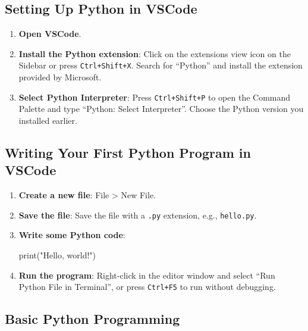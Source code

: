 \documentclass[
  letterpaper,
  DIV=11,
  numbers=noendperiod]{scrreprt}
\newenvironment{Shaded}{\begin{snugshade}}{\end{snugshade}}
\newcommand{\BuiltInTok}[1]{\textcolor[rgb]{0.00,0.23,0.31}{#1}}
\newcommand{\NormalTok}[1]{\textcolor[rgb]{0.00,0.23,0.31}{#1}}
\newcommand{\StringTok}[1]{\textcolor[rgb]{0.13,0.47,0.30}{#1}}
\providecommand{\tightlist}{%
  \setlength{\itemsep}{0pt}\setlength{\parskip}{0pt}}\usepackage{longtable,booktabs,array}
\begin{document}
\subsection{Setting Up Python in
VSCode}\label{setting-up-python-in-vscode}

\begin{enumerate}
\def\labelenumi{\arabic{enumi}.}
\tightlist
\item
  \textbf{Open VSCode}.
\item
  \textbf{Install the Python extension}: Click on the extensions view
  icon on the Sidebar or press \texttt{Ctrl+Shift+X}. Search for
  ``Python'' and install the extension provided by Microsoft.
\item
  \textbf{Select Python Interpreter}: Press \texttt{Ctrl+Shift+P} to
  open the Command Palette and type ``Python: Select Interpreter''.
  Choose the Python version you installed earlier.
\end{enumerate}

\subsection{Writing Your First Python Program in
VSCode}\label{writing-your-first-python-program-in-vscode}

\begin{enumerate}
\def\labelenumi{\arabic{enumi}.}
\item
  \textbf{Create a new file}: File \textgreater{} New File.
\item
  \textbf{Save the file}: Save the file with a \texttt{.py} extension,
  e.g., \texttt{hello.py}.
\item
  \textbf{Write some Python code}:

\begin{Shaded}
\begin{Highlighting}[]
\BuiltInTok{print}\NormalTok{(}\StringTok{"Hello, world!"}\NormalTok{)}
\end{Highlighting}
\end{Shaded}
\item
  \textbf{Run the program}: Right-click in the editor window and select
  ``Run Python File in Terminal'', or press \texttt{Ctrl+F5} to run
  without debugging.
\end{enumerate}

\subsection{Basic Python Programming}\label{basic-python-programming}
\end{document}
